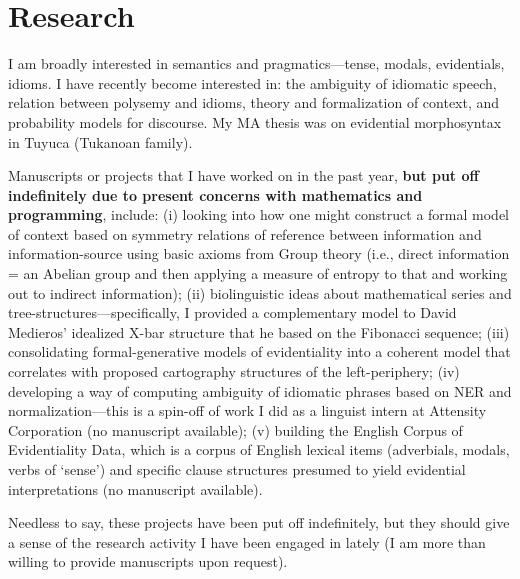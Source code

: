 \documentclass[11pt]{article}
\begin{document}
\section{Research}
I am broadly interested in semantics and pragmatics---tense, modals, evidentials, idioms. I have recently become interested in: the ambiguity of idiomatic speech, relation between polysemy and idioms, theory and formalization of context, and probability models for discourse. My MA thesis was on evidential morphosyntax in Tuyuca (Tukanoan family).


Manuscripts or projects that I have worked on in the past year, \textbf{but put off indefinitely due to present concerns with mathematics and programming}, include: (i) looking into how one might construct a formal model of context based on symmetry relations of reference between information and information-source using basic axioms from Group theory (i.e., direct information = an Abelian group and then applying a measure of entropy to that and working out to indirect information); (ii) biolinguistic ideas about mathematical series and tree-structures---specifically, I provided a complementary model to David Medieros' idealized X-bar structure that he based on the Fibonacci sequence; (iii) consolidating formal-generative models of evidentiality into a coherent model that correlates with proposed cartography structures of the left-periphery; (iv) developing a way of computing ambiguity of idiomatic phrases based on NER and normalization---this is a spin-off of work I did as a linguist intern at Attensity Corporation (no manuscript available); (v) building the English Corpus of Evidentiality Data, which is a corpus of English lexical items (adverbials, modals, verbs of `sense') and specific clause structures presumed to yield evidential interpretations (no manuscript available). 

Needless to say, these projects have been put off indefinitely, but they should give a sense of the research activity I have been engaged in lately (I am more than willing to provide manuscripts upon request).
\end{document}
